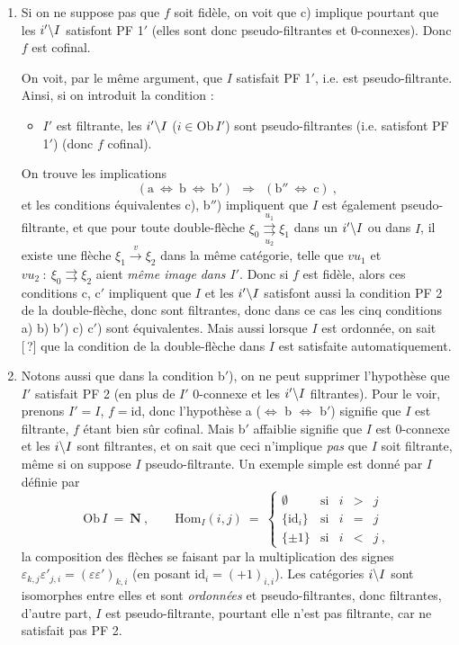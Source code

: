\begin{enumerate}[label=\arabic*$^\circ$)]
\item Si on ne suppose pas que $f$ soit fidèle, on voit que c) implique pourtant que les $i'\backslash I$ satisfont PF 1$'$ (elles sont donc pseudo-filtrantes et 0-connexes). Donc $f$ est cofinal.

On voit, par le même argument, que $I$ satisfait PF 1$'$, i.e. est pseudo-filtrante. Ainsi, si on introduit la condition :
\begin{itemize}[label=]
\item $I'$ est filtrante, les $i'\backslash I$ ($i \in \mathrm{Ob}\, I'$) sont pseudo-filtrantes (i.e. satisfont PF 1$'$) (donc $f$ cofinal).
\end{itemize}
On trouve les implications
\[
(\text{a} \ \Longleftrightarrow \ \text{b} \ \Longleftrightarrow \ \text{b}') \ \ \Longrightarrow \ \ (\text{b}'' \ \Longleftrightarrow \ \text{c}) \ ,
\]
et les conditions équivalentes c), b$''$) impliquent que $I$ est également pseudo-filtrante, et que pour toute double-flèche $\xi_0 \overset{u_1}{\underset{u_2}{\rightrightarrows}} \xi_1$ dans un $i'\backslash I$ ou dans $I$, il existe une flèche $\xi_1 \xrightarrow{v} \xi_2$ dans la même catégorie, telle que $vu_1$ et $vu_2 \ : \ \xi_0 \rightrightarrows \xi_2$ aient \textit{même image}
\textit{dans $I'$}. Donc si $f$ est fidèle, alors ces conditions c, c$'$ impliquent que $I$ et les $i'\backslash I$ satisfont aussi la condition PF 2 de la double-flèche, donc sont filtrantes, donc dans ce cas les cinq conditions a) b) b$'$) c) c$'$) sont équivalentes. Mais aussi lorsque $I$ est ordonnée, on sait [\,?] que la condition de la double-flèche dans $I$ est satisfaite automatiquement.

\item {}Notons aussi que dans la condition b$'$), on ne peut supprimer l'hypothèse que $I'$ satisfait PF 2 (en plus de $I'$ 0-connexe et les $i'\backslash I$ filtrantes). Pour le voir, prenons $I' = I$, $f = \mathrm{id}$, donc l'hypothèse a ($\Longleftrightarrow$ b $\Longleftrightarrow$ b$'$) signifie que $I$ est filtrante, $f$ étant bien sûr cofinal. Mais b$'$ affaiblie signifie que $I$ est 0-connexe et les $i\backslash I$ sont filtrantes, et on sait que ceci n'implique \textit{pas} que $I$ soit filtrante, même si on suppose $I$ pseudo-filtrante. Un exemple simple est donné par $I$ définie par
\[
\mathrm{Ob}\, I \ = \ \mathbf{N} \ , \qquad \mathrm{Hom}_I(i,j) \ = \ \left\{
\begin{array}{rcccc}
\emptyset & \text{si} & i & > & j \\[1ex]
\{\mathrm{id}_i\} & \text{si} & i & = & j \\[1ex]
\{\pm 1\} & \text{si} & i & < & j \ ,
\end{array}
\right.
\]
la composition des flèches se faisant par la multiplication des signes $\varepsilon_{k,j}\varepsilon'_{j,i} = (\varepsilon\varepsilon')_{k,i}$ (en posant $\mathrm{id}_i = (+1)_{i,i}$). Les catégories $i\backslash I$ sont isomorphes entre elles et sont \textit{ordonnées} et pseudo-filtrantes, donc filtrantes, d'autre part, $I$ est pseudo-filtrante, pourtant elle n'est pas filtrante, car ne satisfait pas PF 2.


\end{enumerate}
